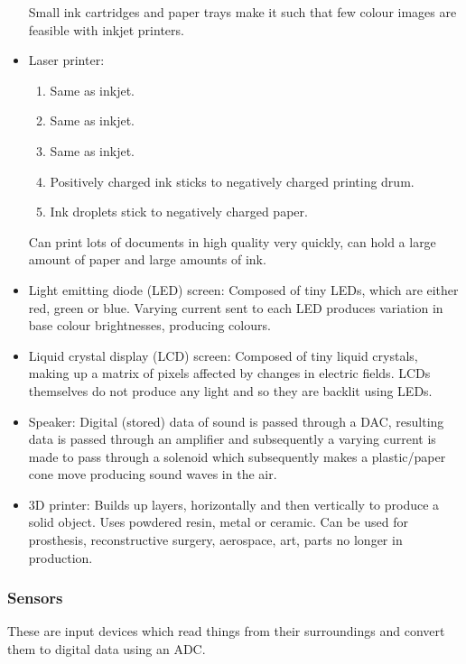 \documentclass{article}
\begin{document}
\begin{itemize}
		Small ink cartridges and paper trays make it such that few colour images are
		feasible with inkjet printers.

	\item Laser printer:
		\begin{enumerate}
			\item Same as inkjet.
			\item Same as inkjet.
			\item Same as inkjet.
			\item Positively charged ink sticks to negatively charged printing drum.
			\item Ink droplets stick to negatively charged paper.
		\end{enumerate}

		Can print lots of documents in high quality very quickly, can hold a large amount
		of paper and large amounts of ink.

	\item Light emitting diode (LED) screen: Composed of tiny LEDs, which are either red,
		green or blue. Varying current sent to each LED produces variation in base colour
		brightnesses, producing colours.

	\item Liquid crystal display (LCD) screen: Composed of tiny liquid crystals, making
		up a matrix of pixels affected by changes in electric fields. LCDs themselves do
		not produce any light and so they are backlit using LEDs.

	\item Speaker: Digital (stored) data of sound is passed through a DAC, resulting data
		is passed through an amplifier and subsequently a varying current is made to pass
		through a solenoid which subsequently makes a plastic/paper cone move producing
		sound waves in the air.

	\item 3D printer: Builds up layers, horizontally and then vertically to produce a
		solid object. Uses powdered resin, metal or ceramic. Can be used for prosthesis,
		reconstructive surgery, aerospace, art, parts no longer in production.
\end{itemize}

\subsubsection{Sensors}
These are input devices which read things from their surroundings and convert them to 
digital data using an ADC.
\end{document}
